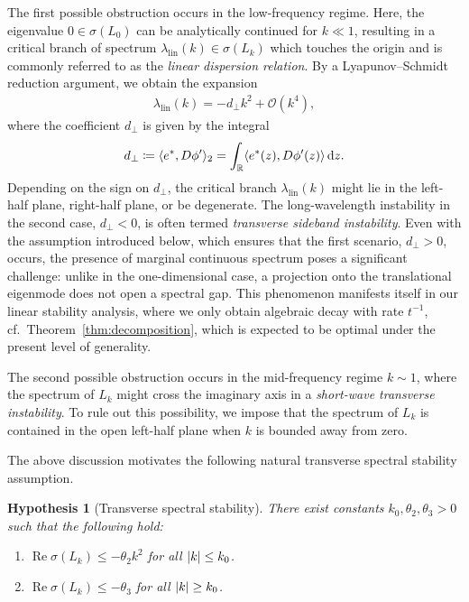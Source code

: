 \documentclass[12pt,oneside,a4paper,reqno]{amsart}
\numberwithin{equation}{section}
\newtheorem{hypothesis}{Hypothesis}
\theoremstyle{definition}
\theoremstyle{remark}
\newcommand{\cO}{{\mathcal O}}
\newcommand{\bbR}{{\mathbb R}}
\newcommand{\rd}{{\,\rm{d}}}
\DeclareMathOperator{\Real}{Re}
\DeclarePairedDelimiter{\abs}{\lvert}{\rvert}
\begin{document}
The first possible obstruction occurs in the low-frequency regime.
Here, the eigenvalue $0 \in \sigma(L_0)$ can be analytically continued for $k \ll 1$, resulting in a critical branch of spectrum $\lambda_{\mathrm{lin}}(k) \in \sigma(L_k)$ which touches the origin and is commonly referred to as the \emph{linear dispersion relation}. By a Lyapunov--Schmidt reduction argument, we obtain the expansion
\begin{align}
    \label{eq:lambdac}
    \lambda_{\mathrm{lin}}(k) = -d_{\bot}k^2 + \cO(k^4),
\end{align}
where the coefficient $d_{\bot}$ is given by the integral
\begin{align}
	\label{eq:defdbot}
	d_{\bot} \coloneq \langle e^*,D \phi'\rangle_2 = \int_{\bbR} \langle e^*(z), D \phi'(z)\rangle \rd z.
\end{align}
Depending on the sign on $d_{\bot}$, the critical branch $\lambda_{\mathrm{lin}}(k)$ might lie in the left-half plane, right-half plane, or be degenerate.
The long-wavelength instability in the second case, $d_\bot < 0$, is often termed \emph{transverse sideband instability}.
Even with the assumption introduced below, which ensures that the first scenario, $d_\bot > 0$, occurs, the presence of marginal continuous spectrum poses a significant challenge:
unlike in the one-dimensional case, a projection onto the translational eigenmode does not open a spectral gap.
This phenomenon manifests itself in our linear stability analysis, where we only obtain algebraic decay with rate $t^{-1}$, cf.~Theorem~\ref{thm:decomposition}, which is expected to be optimal under the present level of generality.

The second possible obstruction occurs in the mid-frequency regime $k \sim 1$, where the spectrum of $L_k$ might cross the imaginary axis in a \emph{short-wave transverse instability}.
To rule out this possibility, we impose that the spectrum of $L_k$ is contained in the open left-half plane when $k$ is bounded away from zero.

The above discussion motivates the following natural transverse spectral stability assumption.

\begin{hypothesis}[Transverse spectral stability]
    \label{hyp:spectrum_multid}
    There exist constants $k_0,\theta_2,\theta_3 > 0$ such that the following hold:
	\begin{enumerate}[label=(\roman*)]
		\item \label{it:spectrum_lowfreq} $\Real \sigma(L_k) \leq -\theta_2 k^2$ for all $\abs{k} \leq k_0$.
        \item \label{it:spectrum_midhighfreq} $\Real \sigma(L_k) \leq -\theta_3$ for all $\abs{k} \geq k_0$.
	\end{enumerate}
\end{hypothesis}
\end{document}
